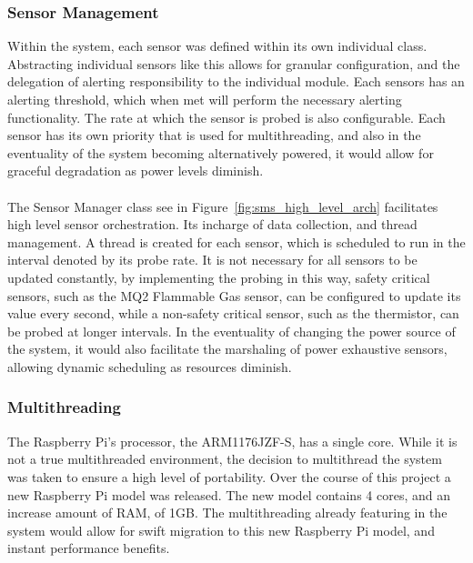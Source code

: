 \documentclass{article}
\begin{document}
\subsubsection{Sensor Management}
Within the system, each sensor was defined within its own individual class. Abstracting individual sensors like this allows for granular configuration, and the delegation of alerting responsibility to the individual module. Each sensors has an alerting threshold, which when met will perform the necessary alerting functionality. The rate at which the sensor is probed is also configurable. Each sensor has its own priority that is used for multithreading, and also in the eventuality of the system becoming alternatively powered, it would allow for graceful degradation as power levels diminish. \\\\
The Sensor Manager class see in Figure~\ref{fig:sms_high_level_arch} facilitates high level sensor orchestration. Its incharge of data collection, and thread management. A thread is created for each sensor, which is scheduled to run in the interval denoted by its probe rate. It is not necessary for all sensors to be updated constantly, by implementing the probing in this way, safety critical sensors, such as the MQ2 Flammable Gas sensor, can be configured to update its value every second, while a non-safety critical sensor, such as the thermistor, can be probed at longer intervals. In the eventuality of changing the power source of the system, it would also facilitate the marshaling of power exhaustive sensors, allowing dynamic scheduling as resources diminish. 

\subsubsection{Multithreading}
The Raspberry Pi’s processor, the ARM1176JZF-S, has a single core. While it is not a true multithreaded environment, the decision to multithread the system was taken to ensure a high level of portability. Over the course of this project a new Raspberry Pi model was released. The new model contains 4 cores, and an increase amount of RAM, of 1GB. The multithreading already featuring in the system would allow for swift migration to this new Raspberry Pi model, and instant performance benefits.
\end{document}
